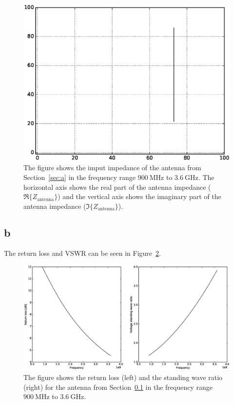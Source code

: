 \documentclass{article}
\begin{document}
\begin{figure}
  \centering
  \includegraphics[width=\textwidth]{impedance1.eps}
  \caption{The figure shows the imput impedance of the antenna from Section~\ref{sec:a} in the frequency range $\SI{900}{\mega\hertz}$ to $\SI{3.6}{\giga\hertz}$. The horizontal axis shows the real part of the antenna impedance ($\Re\{Z_{\text{antenna}}\}$) and the vertical axis shows the imaginary part of the antenna impedance ($\Im\{Z_{\text{antenna}}\}$).}
  \label{fig:imp1}
\end{figure}

\subsection{b}\label{sec:b}
The return loss and VSWR can be seen in Figure~\ref{fig:ans1}.
\begin{figure}
  \centering
  \includegraphics[width=\textwidth]{Answers1.eps}
  \caption{The figure shows the return loss (left) and the standing wave ratio (right) for the antenna from Section~\ref{sec:b} in the frequency range $\SI{900}{\mega\hertz}$ to $\SI{3.6}{\giga\hertz}$.}
  \label{fig:ans1}
\end{figure}
\end{document}
